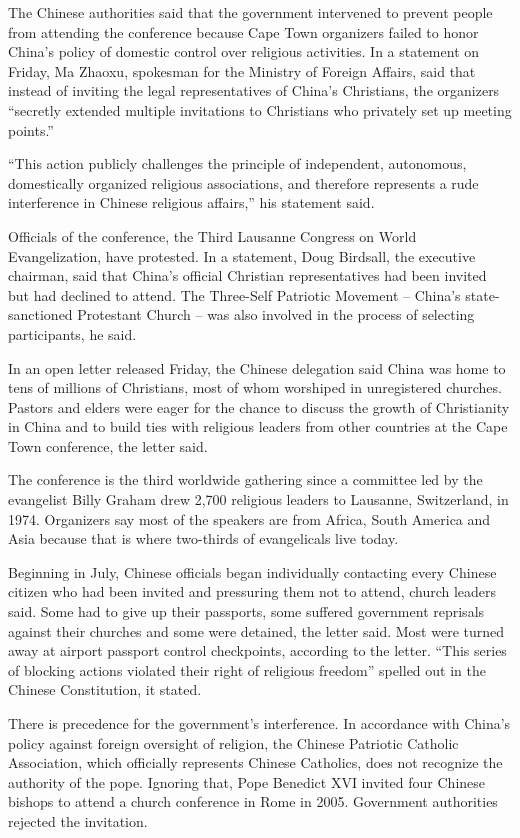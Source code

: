 ﻿\documentclass[12pt]{article}
\begin{document}
The Chinese authorities said that the government intervened to prevent people from attending the
conference because Cape Town organizers failed to honor China's policy of domestic control over
religious activities. In a statement on Friday, Ma Zhaoxu, spokesman for the Ministry of Foreign
Affairs, said that instead of inviting the legal representatives of China's Christians, the
organizers ``secretly extended multiple invitations to Christians who privately set up meeting
points.''

``This action publicly challenges the principle of independent, autonomous, domestically organized
religious associations, and therefore represents a rude interference in Chinese religious affairs,''
his statement said.

Officials of the conference, the Third Lausanne Congress on World Evangelization, have protested. In
a statement, Doug Birdsall, the executive chairman, said that China's official Christian
representatives had been invited but had declined to attend. The Three-Self Patriotic Movement --
China's state-sanctioned Protestant Church -- was also involved in the process of selecting
participants, he said.

In an open letter released Friday, the Chinese delegation said China was home to tens of millions of
Christians, most of whom worshiped in unregistered churches. Pastors and elders were eager for the
chance to discuss the growth of Christianity in China and to build ties with religious leaders from
other countries at the Cape Town conference, the letter said.

The conference is the third worldwide gathering since a committee led by the evangelist Billy Graham
drew 2,700 religious leaders to Lausanne, Switzerland, in 1974. Organizers say most of the speakers
are from Africa, South America and Asia because that is where two-thirds of evangelicals live today.

Beginning in July, Chinese officials began individually contacting every Chinese citizen who had
been invited and pressuring them not to attend, church leaders said. Some had to give up their
passports, some suffered government reprisals against their churches and some were detained, the
letter said. Most were turned away at airport passport control checkpoints, according to the letter.
``This series of blocking actions violated their right of religious freedom'' spelled out in the
Chinese Constitution, it stated.

There is precedence for the government's interference. In accordance with China's policy against
foreign oversight of religion, the Chinese Patriotic Catholic Association, which officially
represents Chinese Catholics, does not recognize the authority of the pope. Ignoring that, Pope
Benedict XVI invited four Chinese bishops to attend a church conference in Rome in 2005. Government
authorities rejected the invitation.
\end{document}

